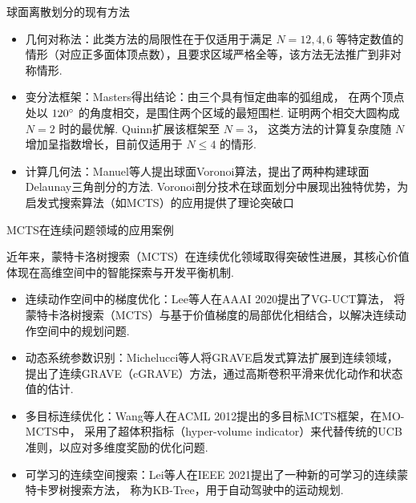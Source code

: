 \documentclass[12pt,aspectratio=169]{beamer}
\begin{document}
\begin{frame}{球面离散划分的现有方法}

  \begin{itemize}

    \item 几何对称法：此类方法的局限性在于仅适用于满足 $N=12,4,6$ 
    等特定数值的情形（对应正多面体顶点数），且要求区域严格全等，该方法无法推广到非对称情形. 

    \item 变分法框架：Masters\cite{masters1996perimeter}得出结论：由三个具有恒定曲率的弧组成，
    在两个顶点处以 $120\degree$ 的角度相交，是围住两个区域的最短围栏. 
    证明两个相交大圆构成 $N=2$ 时的最优解. Quinn\cite{quinn2007least}扩展该框架至 $N=3$，
    这类方法的计算复杂度随 $N$ 增加呈指数增长，目前仅适用于 $N\leq4$ 的情形. 

    \item 计算几何法：Manuel等人\cite{caroli2010robust}提出球面Voronoi算法，提出了两种构建球面Delaunay三角剖分的方法. 
    Voronoi剖分技术在球面划分中展现出独特优势，为启发式搜索算法（如MCTS）的应用提供了理论突破口

  \end{itemize}

\end{frame}

\begin{frame}{MCTS在连续问题领域的应用案例}

  近年来，蒙特卡洛树搜索（MCTS）在连续优化领域取得突破性进展，其核心价值体现在高维空间中的智能探索与开发平衡机制. 

  \begin{itemize}

    \item 连续动作空间中的梯度优化：Lee等人\cite{lee2020monte}在AAAI 2020提出了VG-UCT算法，
    将蒙特卡洛树搜索（MCTS）与基于价值梯度的局部优化相结合，以解决连续动作空间中的规划问题. 

    \item 动态系统参数识别：Michelucci等人\cite{michelucci2024improving}将GRAVE启发式算法扩展到连续领域，
    提出了连续GRAVE（cGRAVE）方法，通过高斯卷积平滑来优化动作和状态值的估计. 

    \item 多目标连续优化：Wang等人\cite{wang2012multi}在ACML 2012提出的多目标MCTS框架，在MO-MCTS中，
    采用了超体积指标（hyper-volume indicator）来代替传统的UCB准则，以应对多维度奖励的优化问题. 

    \item 可学习的连续空间搜索：Lei等人\cite{lei2021kb}在IEEE 2021提出了一种新的可学习的连续蒙特卡罗树搜索方法，
    称为KB-Tree，用于自动驾驶中的运动规划. 

  \end{itemize}

\end{frame}
\end{document}

